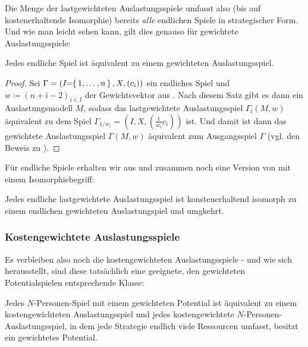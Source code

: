 Die Menge der lastgewichteten Auslastungsspiele umfasst also (bis auf kostenerhaltende Isomorphie) bereits \emph{alle} endlichen Spiele in strategischer Form. Und wie man leicht sehen kann, gilt dies genauso für gewichtete Auslastungsspiele:

\begin{kor}\label{kor:JedesSpielGewAusl}
	Jedes endliche Spiel ist äquivalent zu einem gewichteten Auslastungsspiel.
\end{kor}

\begin{proof}
	Sei $\Gamma = (I\!\!=\!\!\set{1, \dots, n}, X, (c_i))$ ein endliches Spiel und $w \coloneqq (n+i-2)_{i \in I}$ der Gewichtsvektor aus . Nach diesem Satz gibt es dann ein Auslastungsmodell $M$, sodass das lastgewichtete Auslastungsspiel $\Gamma_l(M, w)$ äquivalent zu dem Spiel $\Gamma_{1/w_i} = (I, X, (\frac{1}{w_i}c_i))$ ist. Und damit ist dann das gewichtete Auslastungsspiel $\Gamma(M, w)$ äquivalent zum Ausgangsspiel $\Gamma$ (vgl. den Beweis zu ). 
\end{proof}

Für endliche Spiele erhalten wir aus  und  zusammen noch eine Version von  mit einem Isomorphiebegriff:

\begin{kor}\label{kor:endlLastGewAuslIsomGewAusl}
	Jedes endliche lastgewichtete Auslastungsspiel ist konstenerhaltend isomorph zu einem endlichen gewichteten Auslastungspiel und umgkehrt.
\end{kor}


\subsubsection{Kostengewichtete Auslastungsspiele}

Es verbleiben also noch die kostengewichteten Auslastungsspiele - und wie sich herausstellt, sind diese tatsächlich eine geeignete, den gewichteten Potentialspielen entsprechende Klasse:

\begin{satz}\label{satz:MondererShapleyKostengew}
	Jedes $N$-Personen-Spiel mit einem gewichteten Potential ist äquivalent zu einem kostengewichteten Auslastungsspiel und jedes kostengewichtete $N$-Personen-Auslastungsspiel, in dem jede Strategie endlich viele Ressourcen umfasst, besitzt ein gewichtetes Potential.
\end{satz}

